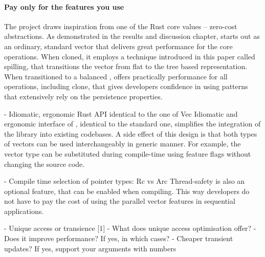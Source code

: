 
\paragraph{Pay only for the features you use}


The project draws inspiration from one of the Rust core values -- zero-cost abstractions. As demonstrated in the results and discussion chapter, \pvec{} starts out as an ordinary, standard vector that delivers great performance for the core operations. When cloned, it employs a technique introduced in this paper called spilling, that transitions the vector from flat to the tree based representation. When transitioned to a balanced \rrbvec{}, \pvec{} offers practically  performance for all operations, including clone, that gives developers confidence in using patterns that extensively rely on the persistence properties. 

- Idiomatic, ergonomic Rust API identical to the one of Vec
Idiomatic and ergonomic interface of \pvecrs{}, identical to the standard one, simplifies the integration of the library into existing codebases. A side effect of this design is that both types of vectors can be used interchangeably in generic manner. For example, the vector type can be substituted during compile-time using feature flags without changing the source code. 

- Compile time selection of pointer types: Rc vs Arc
Thread-safety is also an optional feature, that can be enabled when compiling. This way developers do not have to pay the cost of using the parallel vector features in sequential applications. 

- Unique access or transience [1]
    - What does unique access optimisation offer?
    - Does it improve performance? If yes, in which cases?
        - Cheaper transient updates? If yes, support your arguments with numbers

